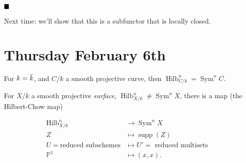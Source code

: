 \(\hfill\blacksquare\)

Next time: we'll show that this is a subfunctor that is locally closed.

\hypertarget{thursday-february-6th}{%
\section{Thursday February 6th}\label{thursday-february-6th}}

For \(k=\mkern 1.5mu\overline{\mkern-1.5muk\mkern-1.5mu}\mkern 1.5mu\),
and \(C/k\) a smooth projective curve, then
\(\operatorname{Hilb}_{C/k}^n = \operatorname{Sym}^n C\).

For \(X/k\) a smooth projective \emph{surface},
\(\operatorname{Hilb}_{X/k}^n \neq \operatorname{Sym}^n X\), there is a
map (the Hilbert-Chow map)

\begin{align*} \operatorname{Hilb}_{X/k}^n &\to \operatorname{Sym}^n X \\ Z &\mapsto {\operatorname{supp}}(Z) \\ U  = \text{reduced subschemes} &\mapsto U' = \text{ reduced multisets } \\ {\mathbb{P}}^1 &\mapsto (x, x) .\end{align*}

